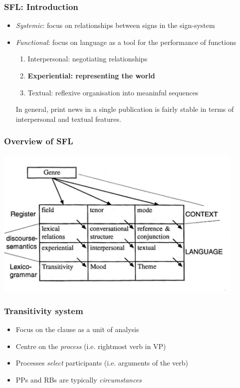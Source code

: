 \documentclass{beamer}       %
\begin{document}
\begin{frame}
\frametitle{SFL: Introduction}
\begin{itemize}
\item \emph{Systemic}: focus on relationships between signs in the sign-system
\item \emph{Functional}: focus on language as a tool for the performance of functions
\begin{enumerate}
    \item Interpersonal: negotiating relationships
    \item \textbf{Experiential: representing the world}
    \item Textual: reflexive organisation into meaninful sequences
\end{enumerate}
In general, print news in a single publication is fairly stable in terms of interpersonal and textual features.
\end{itemize}

\end{frame}

\begin{frame}
    \frametitle{Overview of SFL}
    \centering
    \includegraphics[width=0.90\textwidth]{../../images/egginsfixed.jpg}
\end{frame}

\begin{frame}\frametitle{Transitivity system}
\begin{itemize}
    \item Focus on the clause as a unit of analysis
    \item Centre on the \emph{process} (i.e. rightmost verb in VP)
    \item Processes \emph{select} participants (i.e. arguments of the verb)
    \item PPs and RBs are typically \emph{circumstances}
\end{itemize}
\end{frame}
\end{document}
